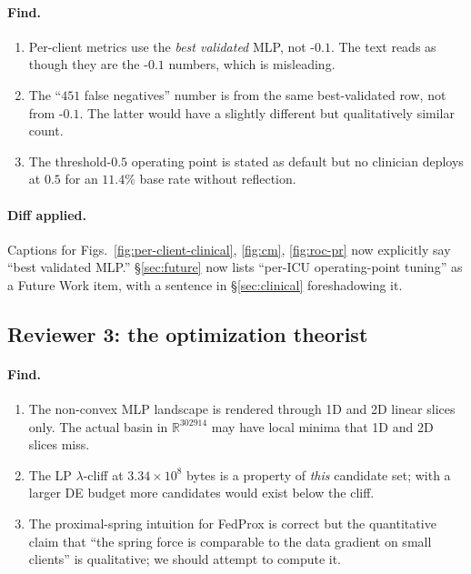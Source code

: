 \paragraph{Find.}
\begin{enumerate}[leftmargin=*,nosep]
    \item Per-client metrics use the \emph{best validated} MLP, not
        \fedprox{}-$0.1$. The text reads as though they are the
        \fedprox{}-$0.1$ numbers, which is misleading.
    \item The ``$451$ false negatives'' number is from the same
        best-validated row, not from \fedprox{}-$0.1$. The latter would
        have a slightly different but qualitatively similar count.
    \item The threshold-$0.5$ operating point is stated as default but no
        clinician deploys at $0.5$ for an $11.4\%$ base rate without
        reflection.
\end{enumerate}
\paragraph{Diff applied.} Captions for Figs.~\ref{fig:per-client-clinical},
\ref{fig:cm}, \ref{fig:roc-pr} now explicitly say ``best validated MLP.''
\S\ref{sec:future} now lists ``per-ICU operating-point tuning'' as a Future
Work item, with a sentence in \S\ref{sec:clinical} foreshadowing it.

\subsection{Reviewer 3: the optimization theorist}
\paragraph{Find.}
\begin{enumerate}[leftmargin=*,nosep]
    \item The non-convex MLP landscape is rendered through 1D and 2D linear
        slices only. The actual basin in $\mathbb{R}^{302914}$ may have local
        minima that 1D and 2D slices miss.
    \item The LP $\lambda$-cliff at $3.34\!\times\!10^8$ bytes is a property
        of \emph{this} candidate set; with a larger DE budget more candidates
        would exist below the cliff.
    \item The proximal-spring intuition for FedProx is correct but the
        quantitative claim that ``the spring force is comparable to the data
        gradient on small clients'' is qualitative; we should attempt to
        compute it.
\end{enumerate}
